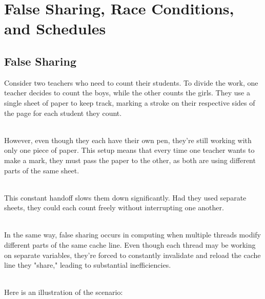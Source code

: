\documentclass[../../main.tex]{subfiles}
\begin{document}
    \section{False Sharing, Race Conditions, and Schedules}
    \subsection{False Sharing}
    Consider two teachers who need to count their students. To divide the work, one teacher decides to count the boys, while the other counts the girls. They use a single sheet of paper to keep track, marking a stroke on their respective sides of the page for each student they count.
    
    ~\\
    However, even though they each have their own pen, they're still working with only one piece of paper. This setup means that every time one teacher wants to make a mark, they must pass the paper to the other, as both are using different parts of the same sheet.

    ~\\
    This constant handoff slows them down significantly. Had they used separate sheets, they could each count freely without interrupting one another.

    ~\\
    In the same way, false sharing occurs in computing when multiple threads modify different parts of the same cache line. Even though each thread may be working on separate variables, they're forced to constantly invalidate and reload the cache line they "share," leading to substantial inefficiencies.

    ~\\
    Here is an illustration of the scenario:
\end{document}
